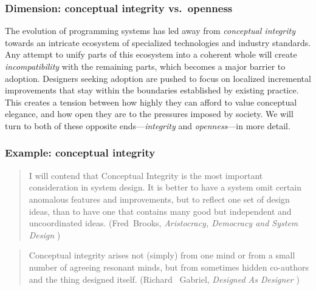 \documentclass[english,submission]{programming}
\begin{document}

\hypertarget{dimension-conceptual-integrity-vs.-openness}{%
\subsubsection{Dimension: conceptual integrity
vs.~openness}\label{dimension-conceptual-integrity-vs.-openness}}

The evolution of programming systems has led away from \emph{conceptual
integrity} towards an intricate ecosystem of specialized technologies
and industry standards. Any attempt to unify parts of this ecosystem
into a coherent whole will create \emph{incompatibility} with the
remaining parts, which becomes a major barrier to adoption. Designers
seeking adoption are pushed to focus on localized incremental
improvements that stay within the boundaries established by existing
practice. This creates a tension between how highly they can afford to
value conceptual elegance, and how open they are to the pressures
imposed by society. We will turn to both of these opposite
ends---\emph{integrity} and \emph{openness}---in more detail.

\hypertarget{example-conceptual-integrity}{%
\subsubsection{Example: conceptual
integrity}\label{example-conceptual-integrity}}

\begin{quote}
I will contend that Conceptual Integrity is the most important
consideration in system design. It is better to have a system omit
certain anomalous features and improvements, but to reflect one set of
design ideas, than to have one that contains many good but independent
and uncoordinated ideas. (Fred~Brooks, \emph{Aristocracy, Democracy and
System Design} \cite{brooks95aristo})
\end{quote}


\begin{quote}
Conceptual integrity arises not (simply) from one mind or from a small
number of agreeing resonant minds, but from sometimes hidden co-authors
and the thing designed itself. (Richard ~Gabriel, \emph{Designed As
Designer} \cite{DesignedAsDesigner})
\end{quote}
\end{document}
